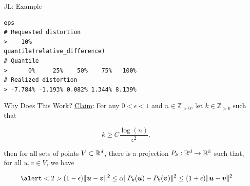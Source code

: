 \documentclass[14pt]{beamer}
\begin{document}
\begin{frame}[fragile]{JL: Example}
  \begin{lstlisting}
eps
# Requested distortion
>    10%
quantile(relative_difference)
# Quantile
>      0%     25%    50%    75%   100%
# Realized distortion
> -7.784% -1.193% 0.082% 1.344% 8.139%
  \end{lstlisting}
\end{frame}

\begin{frame}{Why Does This Work?}
  \underline{Claim}: For any $0<\epsilon<1$ and $n\in\mathbb{Z}_{>0}$, let
  $k\in\mathbb{Z}_{>0}$ such that

  \begin{equation*}
    k \geq C \frac{\log(n)}{\epsilon^2},
  \end{equation*}

  \noindent then for all sets of points $V\subset\mathbb{R}^{d}$, there is a projection
  $P_k:\mathbb{R}^{d}\to\mathbb{R}^{k}$ such that, for all $u,v\in V$, we have

    \begin{equation*}
      \alert<2>{(1 - \epsilon)\|\vu - \vv\|^2 \leq \alpha\|P_k(\vu) - P_k(\vv)\|^2 \leq %
      (1 + \epsilon)\|\vu - \vv\|^2
}    \end{equation*}
\end{frame}
\end{document}
